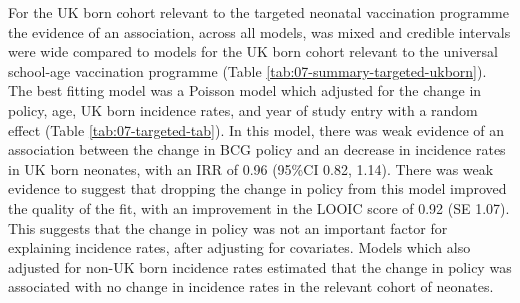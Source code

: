 \documentclass[11pt,twoside]{bristolthesis}
\begin{document}
  For the UK born cohort relevant to the targeted neonatal vaccination programme the evidence of an association, across all models, was mixed and credible intervals were wide compared to models for the UK born cohort relevant to the universal school-age vaccination programme (Table \ref{tab:07-summary-targeted-ukborn}). The best fitting model was a Poisson model which adjusted for the change in policy, age, UK born incidence rates, and year of study entry with a random effect (Table \ref{tab:07-targeted-tab}). In this model, there was weak evidence of an association between the change in BCG policy and an decrease in incidence rates in UK born neonates, with an IRR of 0.96 (95\%CI 0.82, 1.14). There was weak evidence to suggest that dropping the change in policy from this model improved the quality of the fit, with an improvement in the LOOIC score of 0.92 (SE 1.07). This suggests that the change in policy was not an important factor for explaining incidence rates, after adjusting for covariates. Models which also adjusted for non-UK born incidence rates estimated that the change in policy was associated with no change in incidence rates in the relevant cohort of neonates.
  
\end{document}
